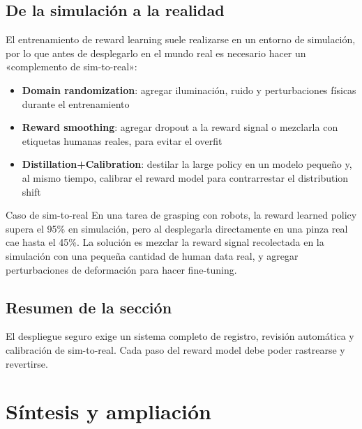\documentclass[a4paper]{article}
\begin{document}
\subsection{De la simulación a la realidad}

El entrenamiento de reward learning suele realizarse en un entorno de simulación, por lo que antes de desplegarlo en el mundo real es necesario hacer un «complemento de sim-to-real»:

\begin{itemize}
    \item \textbf{Domain randomization}: agregar iluminación, ruido y perturbaciones físicas durante el entrenamiento
    \item \textbf{Reward smoothing}: agregar dropout a la reward signal o mezclarla con etiquetas humanas reales, para evitar el overfit
    \item \textbf{Distillation+Calibration}: destilar la large policy en un modelo pequeño y, al mismo tiempo, calibrar el reward model para contrarrestar el distribution shift
\end{itemize}

\begin{knowledgebox}{Caso de sim-to-real}
En una tarea de grasping con robots, la reward learned policy supera el 95\% en simulación, pero al desplegarla directamente en una pinza real cae hasta el 45\%. La solución es mezclar la reward signal recolectada en la simulación con una pequeña cantidad de human data real, y agregar perturbaciones de deformación para hacer fine-tuning.
\end{knowledgebox}

\subsection{Resumen de la sección}

El despliegue seguro exige un sistema completo de registro, revisión automática y calibración de sim-to-real. Cada paso del reward model debe poder rastrearse y revertirse.
\section{Síntesis y ampliación}
\end{document}
